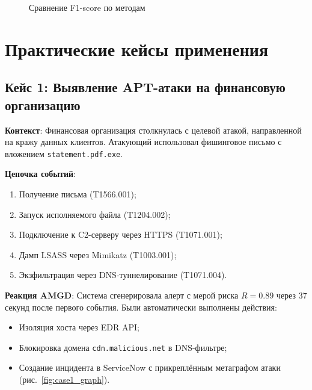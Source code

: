 \documentclass{article}
\begin{document}
\begin{figure}[h]
    \centering
    \caption{Сравнение F1-score по методам}
    \label{fig:f1_comparison}
\end{figure}

\section{Практические кейсы применения}\label{sec:ch4/sect5}

\subsection{Кейс 1: Выявление APT-атаки на финансовую организацию}

\textbf{Контекст}:  
Финансовая организация столкнулась с целевой атакой, направленной на кражу данных клиентов. Атакующий использовал фишинговое письмо с вложением \texttt{statement.pdf.exe}.

\textbf{Цепочка событий}:
\begin{enumerate}
    \item Получение письма (T1566.001);
    \item Запуск исполняемого файла (T1204.002);
    \item Подключение к C2-серверу через HTTPS (T1071.001);
    \item Дамп LSASS через Mimikatz (T1003.001);
    \item Экзфильтрация через DNS-туннелирование (T1071.004).
\end{enumerate}

\textbf{Реакция AMGD}:  
Система сгенерировала алерт с мерой риска $R = 0.89$ через 37 секунд после первого события. Были автоматически выполнены действия:
\begin{itemize}
    \item Изоляция хоста через EDR API;
    \item Блокировка домена \texttt{cdn.malicious.net} в DNS-фильтре;
    \item Создание инцидента в ServiceNow с прикреплённым метаграфом атаки (рис.~\ref{fig:case1_graph}).
\end{itemize}
\end{document}
